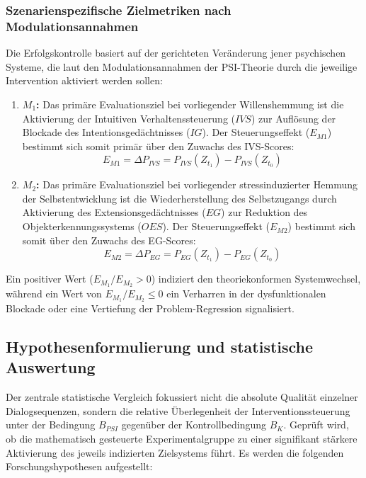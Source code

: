 \subsubsection{Szenarienspezifische Zielmetriken nach Modulationsannahmen}
Die Erfolgskontrolle basiert auf der gerichteten Veränderung jener psychischen Systeme, die laut den Modulationsannahmen der PSI-Theorie durch die jeweilige Intervention aktiviert werden sollen:
\begin{enumerate}
    \item \textbf{$M_{1}$:} Das primäre Evaluationsziel bei vorliegender Willenshemmung ist die Aktivierung der Intuitiven Verhaltenssteuerung ($IVS$) zur Auflösung der Blockade des Intentionsgedächtnisses ($IG$). Der Steuerungseffekt ($E_{M1}$) bestimmt sich somit primär über den Zuwachs des IVS-Scores:
    \begin{equation}
        E_{M1} = \Delta P_{IVS} = P_{IVS}(Z_{t_1}) - P_{IVS}(Z_{t_0})
    \end{equation}
    \item \textbf{$M_{2}$:} Das primäre Evaluationsziel bei vorliegender stressinduzierter Hemmung der Selbstentwicklung ist die Wiederherstellung des Selbstzugangs durch Aktivierung des Extensionsgedächtnisses ($EG$) zur Reduktion des Objekterkennungssystems ($OES$). Der Steuerungseffekt ($E_{M2}$) bestimmt sich somit über den Zuwachs des EG-Scores:
    \begin{equation}
        E_{M2} = \Delta P_{EG} = P_{EG}(Z_{t_1}) - P_{EG}(Z_{t_0})
    \end{equation}
\end{enumerate}

Ein positiver Wert ($E_{M_1}/E_{M_2} > 0$) indiziert den theoriekonformen Systemwechsel, während ein Wert von $E_{M_1}/E_{M_2} \le 0$ ein Verharren in der dysfunktionalen Blockade oder eine Vertiefung der Problem-Regression signalisiert.

\subsection{Hypothesenformulierung und statistische Auswertung}
Der zentrale statistische Vergleich fokussiert nicht die absolute Qualität einzelner Dialogsequenzen, sondern die relative Überlegenheit der Interventionssteuerung unter der Bedingung $B_{PSI}$ gegenüber der Kontrollbedingung $B_{K}$. Geprüft wird, ob die mathematisch gesteuerte Experimentalgruppe zu einer signifikant stärkere Aktivierung des jeweils indizierten Zielsystems führt. Es werden die folgenden Forschungshypothesen aufgestellt:

